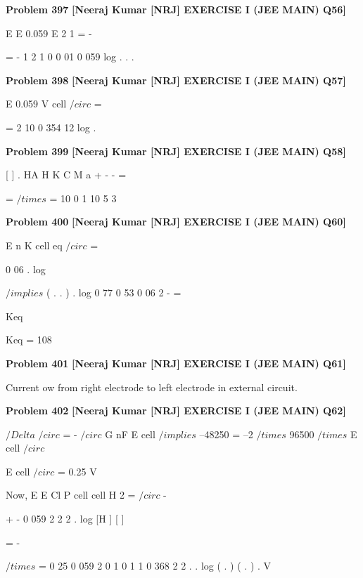 \begin{problembox}
\textbf{Problem 397} \hfill \textbf{[Neeraj Kumar [NRJ] EXERCISE I (JEE MAIN) Q56]}
\label{q:ext-nrj_all_questions-397}

E
E
0.059
E
2
1
=
-
 
=
-
1
2
1 0
0 01
0 059
log
.
.
.
\end{problembox}

\begin{problembox}
\textbf{Problem 398} \hfill \textbf{[Neeraj Kumar [NRJ] EXERCISE I (JEE MAIN) Q57]}
\label{q:ext-nrj_all_questions-398}

E
0.059
V
cell
$/circ$
=
 
=
2
10
0 354
12
log
.
\end{problembox}

\begin{problembox}
\textbf{Problem 399} \hfill \textbf{[Neeraj Kumar [NRJ] EXERCISE I (JEE MAIN) Q58]}
\label{q:ext-nrj_all_questions-399}

[
]
.
HA
H
K
C
M
a
+
-
-
=
 
=
$/times$
=
10
0 1
10
5
3
\end{problembox}

\begin{problembox}
\textbf{Problem 400} \hfill \textbf{[Neeraj Kumar [NRJ] EXERCISE I (JEE MAIN) Q60]}
\label{q:ext-nrj_all_questions-400}

E
n
K
cell
eq
$/circ$
=
 
0 06
.
log
 
 
 $/implies$ ( .
.
)
.
log
0 77
0 53
0 06
2
-
=
 
Keq
 
   Keq = 108
\end{problembox}

\begin{problembox}
\textbf{Problem 401} \hfill \textbf{[Neeraj Kumar [NRJ] EXERCISE I (JEE MAIN) Q61]}
\label{q:ext-nrj_all_questions-401}

Current   ow from right electrode to left electrode 
in external circuit.
\end{problembox}

\begin{problembox}
\textbf{Problem 402} \hfill \textbf{[Neeraj Kumar [NRJ] EXERCISE I (JEE MAIN) Q62]}
\label{q:ext-nrj_all_questions-402}

$/Delta$
$/circ$ = -
 $/circ$
G
nF E cell $/implies$ --48250 = --2 $/times$ 96500 $/times$ E cell
$/circ$
 
   E cell
$/circ$
 = 0.25 V
 
 Now, E
E
Cl
P
cell
cell
H 2
=
$/circ$
-
 
+
-
0 059
2
2
2
.
log [H ] [
]
 
 
=
-
 
$/times$
=
0 25
0 059
2
0 1
0 1
1
0 368
2
2
.
.
log ( . )
( . )
.
V
\end{problembox}

